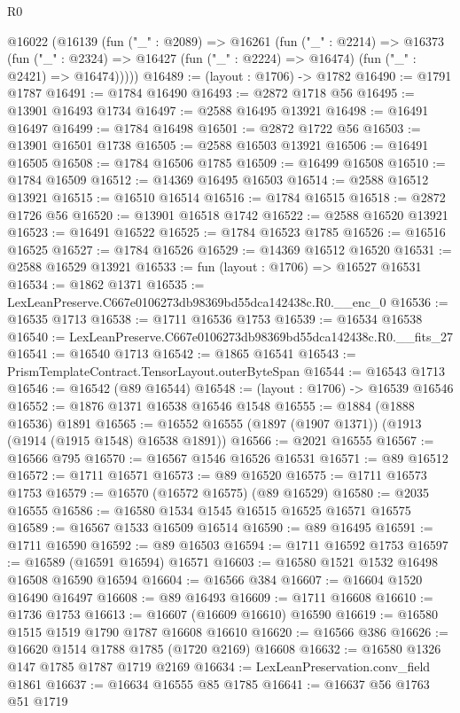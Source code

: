 \begin{lexlean}{R0}
\begin{coremodule}
  @16022
    (@16139
      (fun ("_" : @2089) =>
      @16261
        (fun ("_" : @2214) =>
        @16373
          (fun ("_" : @2324) =>
          @16427 (fun ("_" : @2224) => @16474) (fun ("_" : @2421) => @16474)))))
@16489 := (layout : @1706) -> @1782
@16490 := @1791 @1787
@16491 := @1784 @16490
@16493 := @2872 @1718 @56
@16495 := @13901 @16493 @1734
@16497 := @2588 @16495 @13921
@16498 := @16491 @16497
@16499 := @1784 @16498
@16501 := @2872 @1722 @56
@16503 := @13901 @16501 @1738
@16505 := @2588 @16503 @13921
@16506 := @16491 @16505
@16508 := @1784 @16506 @1785
@16509 := @16499 @16508
@16510 := @1784 @16509
@16512 := @14369 @16495 @16503
@16514 := @2588 @16512 @13921
@16515 := @16510 @16514
@16516 := @1784 @16515
@16518 := @2872 @1726 @56
@16520 := @13901 @16518 @1742
@16522 := @2588 @16520 @13921
@16523 := @16491 @16522
@16525 := @1784 @16523 @1785
@16526 := @16516 @16525
@16527 := @1784 @16526
@16529 := @14369 @16512 @16520
@16531 := @2588 @16529 @13921
@16533 := fun (layout : @1706) => @16527 @16531
@16534 := @1862 @1371
@16535 := LexLeanPreserve.C667e0106273db98369bd55dca142438c.R0.__enc_0
@16536 := @16535 @1713
@16538 := @1711 @16536 @1753
@16539 := @16534 @16538
@16540 := LexLeanPreserve.C667e0106273db98369bd55dca142438c.R0.__fits_27
@16541 := @16540 @1713
@16542 := @1865 @16541
@16543 := PrismTemplateContract.TensorLayout.outerByteSpan
@16544 := @16543 @1713
@16546 := @16542 (@89 @16544)
@16548 := (layout : @1706) -> @16539 @16546
@16552 := @1876 @1371 @16538 @16546 @1548
@16555 := @1884 (@1888 @16536) @1891
@16565 := @16552 @16555 (@1897 (@1907 @1371)) (@1913 (@1914 (@1915 @1548) @16538 @1891))
@16566 := @2021 @16555
@16567 := @16566 @795
@16570 := @16567 @1546 @16526 @16531
@16571 := @89 @16512
@16572 := @1711 @16571
@16573 := @89 @16520
@16575 := @1711 @16573 @1753
@16579 := @16570 (@16572 @16575) (@89 @16529)
@16580 := @2035 @16555
@16586 := @16580 @1534 @1545 @16515 @16525 @16571 @16575
@16589 := @16567 @1533 @16509 @16514
@16590 := @89 @16495
@16591 := @1711 @16590
@16592 := @89 @16503
@16594 := @1711 @16592 @1753
@16597 := @16589 (@16591 @16594) @16571
@16603 := @16580 @1521 @1532 @16498 @16508 @16590 @16594
@16604 := @16566 @384
@16607 := @16604 @1520 @16490 @16497
@16608 := @89 @16493
@16609 := @1711 @16608
@16610 := @1736 @1753
@16613 := @16607 (@16609 @16610) @16590
@16619 := @16580 @1515 @1519 @1790 @1787 @16608 @16610
@16620 := @16566 @386
@16626 := @16620 @1514 @1788 @1785 (@1720 @2169) @16608
@16632 := @16580 @1326 @147 @1785 @1787 @1719 @2169
@16634 := LexLeanPreservation.conv_field @1861
@16637 := @16634 @16555 @85 @1785
@16641 := @16637 @56 @1763 @51 @1719

\end{coremodule}
\end{lexlean}
